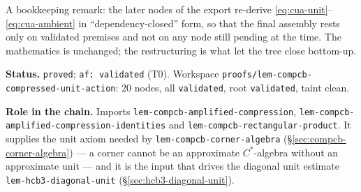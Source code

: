 A bookkeeping remark: the later nodes of the export re-derive
\eqref{eq:cua-unit}--\eqref{eq:cua-ambient} in ``dependency-closed'' form, so that the
final assembly rests only on validated premises and not on any node still pending at the
time. The mathematics is unchanged; the restructuring is what let the tree close
bottom-up.

\medskip
\noindent\textbf{Status.} \texttt{proved}; \texttt{af: validated} (T0). Workspace
\texttt{proofs/lem-compcb-compressed-unit-action}: 20 nodes, all \texttt{validated}, root
\texttt{validated}, taint clean.

\noindent\textbf{Role in the chain.} Imports
\texttt{lem-compcb-amplified-compression},
\texttt{lem-compcb-amplified-compression-identities} and
\texttt{lem-compcb-rectangular-product}. It supplies the unit axiom needed by
\texttt{lem-compcb-corner-algebra} (\S\ref{sec:compcb-corner-algebra}) --- a corner cannot
be an approximate $C^*$-algebra without an approximate unit --- and it is the input that
drives the diagonal unit estimate \texttt{lem-hcb3-diagonal-unit}
(\S\ref{sec:hcb3-diagonal-unit}).
